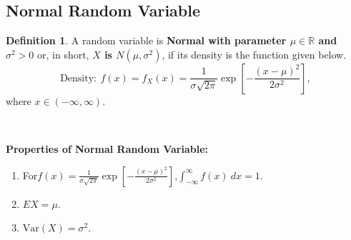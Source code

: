 \documentclass[12pt,openany]{book}
\theoremstyle{definition}
\newtheorem{definition}{Definition}[chapter]
\newcommand{\dispsty}{\displaystyle}
\newcommand{\Var}{\text{Var}}
\begin{document}
	\subsection{Normal Random Variable}
	\begin{tcolorbox}[colback=white]
		\begin{definition}
			A random variable is \textbf{Normal with parameter $\mu\in\mathbb{R}$ and $\sigma^2>0$} or, in short, \textbf{$X$ is $N(\mu,\sigma^2)$}, if its density is the function given below. \[
			\text{Density}:\ f(x)=f_X(x)=\frac{1}{\sigma\sqrt{2\pi}}\exp\left[-\frac{(x-\mu)^2}{2\sigma^2}\right],
			\] where $x\in(-\infty,\infty)$.
		\end{definition}
	\end{tcolorbox} 
	\
	\begin{tcolorbox}[colback=white]
		\textbf{Properties of Normal Random Variable:}\begin{enumerate}
			\item For$f(x)=\dispsty\frac{1}{\sigma\sqrt{2\pi}}\exp\left[-\frac{(x-\mu)^2}{2\sigma^2}\right]$,\quad $
			\dispsty\int_{-\infty}^{\infty} f(x)\ dx=1.
			$
			\item $EX=\mu$.
			\item $\Var(X)=\sigma^2$.
		\end{enumerate}
	\end{tcolorbox}
	\
\end{document}
